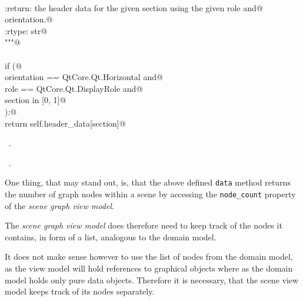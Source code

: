 \documentclass[
    a4paper,      %
    10pt,         %
    openright,    %
    notitlepage,  %
    parskip=half, %
]{scrreprt}       %
\theoremstyle{definition}                    %
\begin{document}
\begin{flushleft}
\begin{minipage}{\linewidth}
\begin{list}{}{}
\mbox{}\lstinline@@\\
\mbox{}\lstinline@    :return: the header data for the given section using the given role and@\\
\mbox{}\lstinline@             orientation.@\\
\mbox{}\lstinline@    :rtype:  str@\\
\mbox{}\lstinline@    """@\\
\mbox{}\lstinline@@\\
\mbox{}\lstinline@    if (@\\
\mbox{}\lstinline@            orientation == QtCore.Qt.Horizontal  and@\\
\mbox{}\lstinline@            role        == QtCore.Qt.DisplayRole and@\\
\mbox{}\lstinline@            section     in [0, 1]@\\
\mbox{}\lstinline@    ):@\\
\mbox{}\lstinline@        return self.header_data[section]@\\
\mbox{}\lstinline@@{\NWsep}
\end{list}
\vspace{-1.5ex}
\footnotesize
\begin{list}{}{\setlength{\itemsep}{-\parsep}\setlength{\itemindent}{-\leftmargin}}
\item \NWtxtMacroDefBy\ .
\item \NWtxtMacroRefIn\ .

\item{}
\end{list}
\end{minipage}\vspace{4ex}
\end{flushleft}
One thing, that may stand out, is, that the above defined \verb+data+ method
returns the number of graph nodes within a scene by accessing the
\verb+node_count+ property of the \textit{scene graph view model}.

The \textit{scene graph view model} does therefore need to keep track of the nodes it
contains, in form of a list, analogous to the domain model.

It does not make sense however to use the list of nodes from the domain model,
as the view model will hold references to graphical objects where as the domain
model holds only pure data objects. Therefore it is necessary, that the scene
view model keeps track of its nodes separately.
\end{document}
